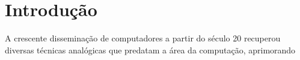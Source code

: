 
\section{Introdução}
\label{sec.intro}

A crescente disseminação de computadores a partir do século 20 recuperou diversas técnicas analógicas que predatam a área da computação, aprimorando 

~\cite{avila2013brasil}